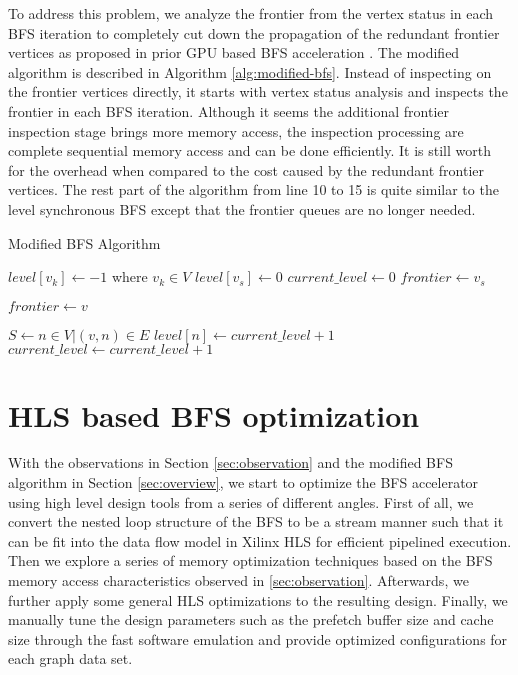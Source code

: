 To address this problem, we analyze the frontier from the 
vertex status in each BFS iteration to completely cut down the 
propagation of the redundant frontier vertices as proposed in prior 
GPU based BFS acceleration \cite{liu2015enterprise}. The modified algorithm is described 
in Algorithm \ref{alg:modified-bfs}. Instead of inspecting on the frontier vertices directly, 
it starts with vertex status analysis and inspects the frontier 
in each BFS iteration. Although it seems the additional frontier inspection stage 
brings more memory access, the inspection processing are complete sequential 
memory access and can be done efficiently. It is still worth for the overhead 
when compared to the cost caused by the redundant frontier vertices. 
The rest part of the algorithm from line 10 to 15 is 
quite similar to the level synchronous BFS except that the frontier queues 
are no longer needed.

\begin{algorithm}
	\caption{Modified BFS Algorithm} \label{alg:modified-bfs}
    \small
	\begin{algorithmic}[1]
		\State $level[v_k] \gets -1$ where $v_k \in V$
		\State $level[v_s] \gets 0$
		\State $current\_level \gets 0$
		\State $frontier \gets v_s$


		\State $frontier \gets v$
		\EndIf
		\EndFor

		\State $S \gets {n \in V | (v, n) \in E}$
		\State $level[n] \gets current\_level + 1$
		\EndIf
		\EndFor
		\EndFor
		\State $current\_level \gets current\_level + 1$
		\EndWhile
		\EndProcedure
	\end{algorithmic}
\end{algorithm}

\section{HLS based BFS optimization} \label{sec:bfs-opt}
With the observations in Section \ref{sec:observation} 
and the modified BFS algorithm in Section \ref{sec:overview}, 
we start to optimize the BFS accelerator using high level design tools 
from a series of different angles. First of all, we convert the nested loop structure 
of the BFS to be a stream manner such that it can be fit into the data flow model in
Xilinx HLS for efficient pipelined execution. Then we explore a series of memory optimization 
techniques based on the BFS memory access characteristics observed in \ref{sec:observation}. 
Afterwards, we further apply some general HLS optimizations to the resulting design. Finally, 
we manually tune the design parameters such as the prefetch buffer size and cache size through 
the fast software emulation and provide optimized configurations for each graph data set.

